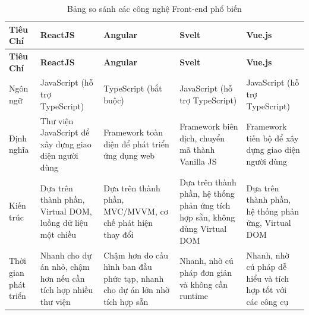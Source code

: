 \begin{enumerate}[(a)]
	      \newpage

	      \begin{landscape}  %
		      \begin{longtable}{|p{3.5cm}|p{5cm}|p{5cm}|p{5cm}|p{5cm}|}
			      \caption{Bảng so sánh các công nghệ Front-end phổ biến}
			      \hline
			      \textbf{Tiêu Chí}    & \textbf{ReactJS}                                              & \textbf{Angular}                                                            & \textbf{Svelt}                                                              & \textbf{Vue.js}                                                            \\
			      \hline
			      \endfirsthead
			      \hline
			      \textbf{Tiêu Chí}    & \textbf{ReactJS}                                              & \textbf{Angular}                                                            & \textbf{Svelt}                                                              & \textbf{Vue.js}                                                            \\
			      \hline
			      \endhead
			      \hline
			      Ngôn ngữ             & JavaScript (hỗ trợ TypeScript)                                & TypeScript (bắt buộc)                                                       & JavaScript (hỗ trợ TypeScript)                                              & JavaScript (hỗ trợ TypeScript)                                             \\
			      \hline
			      Định nghĩa           & Thư viện JavaScript để xây dựng giao diện người dùng          & Framework toàn diện để phát triển ứng dụng web                              & Framework biên dịch, chuyển mã thành Vanilla JS                             & Framework tiến bộ để xây dựng giao diện người dùng                         \\
			      \hline
			      Kiến trúc            & Dựa trên thành phần, Virtual DOM, luồng dữ liệu một chiều     & Dựa trên thành phần, MVC/MVVM, cơ chế phát hiện thay đổi                    & Dựa trên thành phần, hệ thống phản ứng tích hợp sẵn, không dùng Virtual DOM & Dựa trên thành phần, hệ thống phản ứng, Virtual DOM                        \\
			      \hline
			      Thời gian phát triển & Nhanh cho dự án nhỏ, chậm hơn nếu cần tích hợp nhiều thư viện & Chậm hơn do cấu hình ban đầu phức tạp, nhanh cho dự án lớn nhờ tích hợp sẵn & Nhanh, nhờ cú pháp đơn giản và không cần runtime                            & Nhanh, nhờ cú pháp dễ hiểu và tích hợp tốt với các công cụ                 \\

\end{longtable}
\end{landscape}
\end{enumerate}
